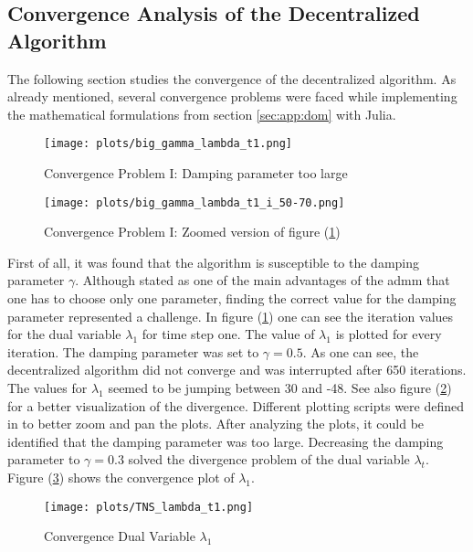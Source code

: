 \subsection{Convergence Analysis of the Decentralized Algorithm}
\label{sec:res:conv}

The following section studies the convergence of the decentralized algorithm. As already mentioned, several convergence problems were faced while implementing the mathematical formulations from section \ref{sec:app:dom} with Julia. \\

\begin{figure}[h!]
	\centering
	\texttt{[image: plots/big\_gamma\_lambda\_t1.png]}
	\caption{Convergence Problem I: Damping parameter too large}
	\label{fig:conv-problem-1}
\end{figure}

\begin{figure}[h!]
	\centering
	\texttt{[image: plots/big\_gamma\_lambda\_t1\_i\_50-70.png]}
	\caption{Convergence Problem I: Zoomed version of figure (\ref{fig:conv-problem-1})}
	\label{fig:conv-problem-1-zoom}
\end{figure}

First of all, it was found that the algorithm is susceptible to the damping parameter $\gamma$. Although stated as one of the main advantages of the \gls{admm} that one has to choose only one parameter, finding the correct value for the damping parameter represented a challenge. In figure (\ref{fig:conv-problem-1}) one can see the iteration values for the dual variable $\lambda_1$ for time step one. The value of $\lambda_1$ is plotted for every iteration. The damping parameter was set to $\gamma = 0.5$. As one can see, the decentralized algorithm did not converge and was interrupted after 650 iterations. The values for $\lambda_1$ seemed to be jumping between 30 and -48. See also figure (\ref{fig:conv-problem-1-zoom}) for a better visualization of the divergence. Different plotting scripts were defined in  to better zoom and pan the plots. After analyzing the plots, it could be identified that the damping parameter was too large. Decreasing the damping parameter to $\gamma = 0.3$ solved the divergence problem of the dual variable $\lambda_t$. Figure (\ref{fig:conv-lambda}) shows the convergence plot of $\lambda_1$. \\

\begin{figure}[h!]
	\centering
	\texttt{[image: plots/TNS\_lambda\_t1.png]}
	\caption{Convergence Dual Variable $\lambda_1$}
	\label{fig:conv-lambda}
\end{figure}

